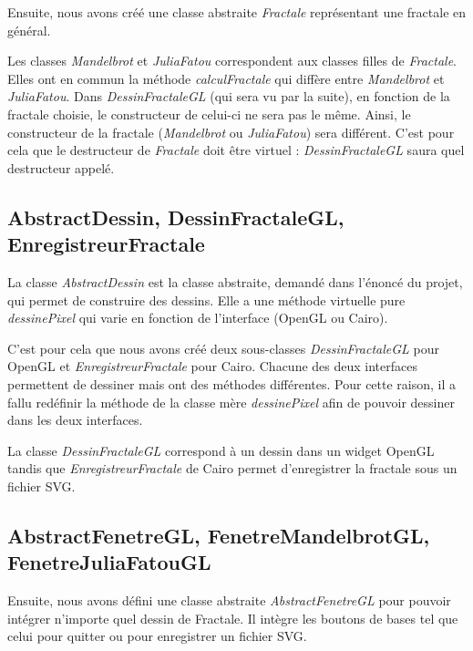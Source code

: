 \documentclass[a4]{article}
\begin{document}
Ensuite, nous avons créé une classe abstraite \emph{Fractale} représentant une fractale en général. 
\vspace{1\baselineskip} 

Les classes \emph{Mandelbrot} et \emph{JuliaFatou} correspondent aux classes filles de \emph{Fractale}. Elles ont en commun la méthode \emph{calculFractale} qui diffère entre \emph{Mandelbrot} et \emph{JuliaFatou}. 
Dans \emph{DessinFractaleGL} (qui sera vu par la suite), en fonction de la fractale choisie, le constructeur de celui-ci ne sera pas le même. Ainsi, le constructeur de la fractale (\emph{Mandelbrot} ou \emph{JuliaFatou}) sera différent. 
C'est pour cela que le destructeur de \emph{Fractale} doit être virtuel : \emph{DessinFractaleGL} saura quel destructeur appelé. 
\vspace{1\baselineskip}

\subsection{AbstractDessin, DessinFractaleGL, EnregistreurFractale}

La classe \emph{AbstractDessin} est la classe abstraite, demandé dans l'énoncé du projet, qui permet de construire des dessins. 
Elle a une méthode virtuelle pure \emph{dessinePixel} qui varie en fonction de l'interface (OpenGL ou Cairo). 
\vspace{1\baselineskip} 

C'est pour cela que nous avons créé deux sous-classes \emph{DessinFractaleGL} pour OpenGL et \emph{EnregistreurFractale} pour Cairo. 
Chacune des deux interfaces permettent de dessiner mais ont des méthodes différentes. Pour cette raison, il a fallu redéfinir la méthode de la classe mère 
\emph{dessinePixel} afin de pouvoir dessiner dans les deux interfaces. 
\vspace{1\baselineskip} 

La classe \emph{DessinFractaleGL} correspond à un dessin dans un widget OpenGL tandis que \emph{EnregistreurFractale} de Cairo permet d'enregistrer la fractale sous un fichier SVG. 
\vspace{1\baselineskip}

\subsection{AbstractFenetreGL, FenetreMandelbrotGL, FenetreJuliaFatouGL}

Ensuite, nous avons défini une classe abstraite \emph{AbstractFenetreGL} pour pouvoir intégrer n'importe quel dessin de Fractale. Il intègre les boutons de bases tel que celui pour quitter 
ou pour enregistrer un fichier SVG. 
\end{document}
